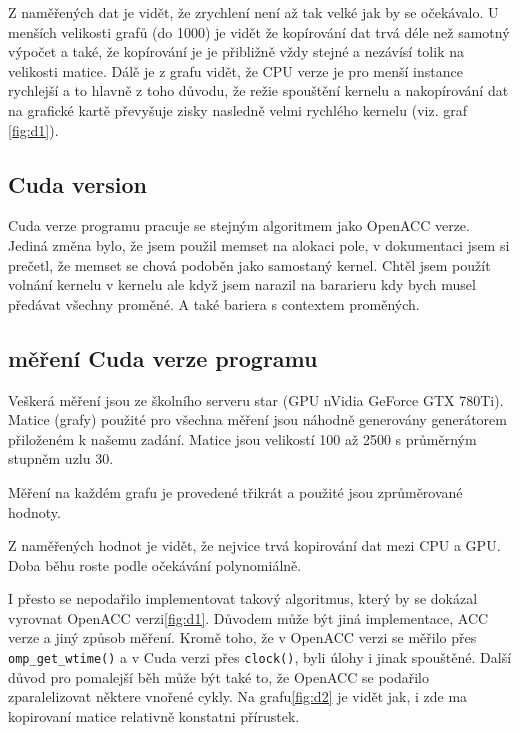 \documentclass[11pt, fleqn]{article}
\begin{document}
Z naměřených dat je vidět, že zrychlení není až tak velké jak by se očekávalo. U menších velikosti grafů (do 1000) je vidět že kopírování dat trvá déle než samotný výpočet a také, že kopírování je je přibližně vždy stejné a nezávísí tolik na velikosti matice. Dálě je z grafu vidět, že CPU verze je pro menší instance rychlejší a to hlavně z toho důvodu, že režie spouštění kernelu a nakopírování dat na grafické kartě převyšuje zisky nasledně velmi rychlého kernelu (viz. graf \ref{fig:d1}).


\subsection{Cuda version}

Cuda verze programu pracuje se stejným algoritmem jako OpenACC verze. Jediná změna bylo, že jsem použil memset na alokaci pole, v dokumentaci jsem si prečetl, že memset se chová podoběn jako samostaný kernel. Chtěl jsem použít volnání kernelu v kernelu ale když jsem narazil na bararieru kdy bych musel předávat všechny proměné. A také bariera s contextem proměných.

\subsection{měření Cuda verze programu}

Veškerá měření jsou ze školního serveru star (GPU nVidia GeForce GTX 780Ti). Matice (grafy) použité pro všechna měření jsou náhodně generovány generátorem přiloženém k našemu zadání. Matice jsou velikostí 100 až 2500 s průměrným stupněm uzlu 30.

Měření na každém grafu je provedené třikrát a použité jsou zprůměrované hodnoty.

Z naměřených hodnot je vidět, že nejvice trvá kopirování dat mezi CPU a GPU. Doba běhu roste podle očekávání polynomiálně.

I přesto se nepodařilo implementovat takový algoritmus, který by se dokázal vyrovnat OpenACC verzi\ref{fig:d1}. Důvodem může být jiná implementace, ACC verze a jiný způsob měření. Kromě toho, že v OpenACC verzi se měřilo přes \lstinline{omp_get_wtime()} a v Cuda verzi přes \lstinline{clock()}, byli úlohy i jinak spouštěné. Další důvod pro pomalejší běh může být také to, že OpenACC se podařilo zparalelizovat některe vnořené cykly. Na grafu\ref{fig:d2} je vidět jak, i zde ma kopirovaní matice relativně konstatni přírustek.
\end{document}
